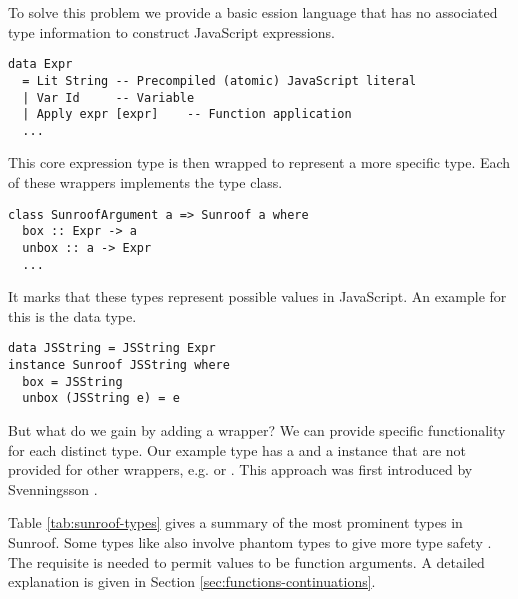 To solve this problem we provide a basic ession 
language that has no associated type information to construct 
JavaScript expressions.
\begin{verbatim}
data Expr 
  = Lit String -- Precompiled (atomic) JavaScript literal
  | Var Id     -- Variable
  | Apply expr [expr]    -- Function application
  ...
\end{verbatim}
This core expression type is then wrapped to represent a more specific 
type. Each of these wrappers implements the  type 
class.
\begin{verbatim}
class SunroofArgument a => Sunroof a where
  box :: Expr -> a
  unbox :: a -> Expr
  ...
\end{verbatim}
It marks that these types represent possible values in JavaScript.
An example for this is the  data type.
\begin{verbatim}
data JSString = JSString Expr
instance Sunroof JSString where
  box = JSString
  unbox (JSString e) = e
\end{verbatim}
But what do we gain by adding a wrapper? We can
provide specific functionality for each distinct type.
Our example type  has a  and a 
 instance that are not provided for other 
wrappers, e.g.  or .
This approach was first introduced by 
Svenningsson \cite{Svenningsson:12:CombiningEmbedding}.

Table \ref{tab:sunroof-types} gives a summary of the 
most prominent types in Sunroof. Some types like  also involve 
phantom types to give more type safety .
The requisite  is needed to permit values
to be function arguments. A detailed explanation is given in 
Section \ref{sec:functions-continuations}.





